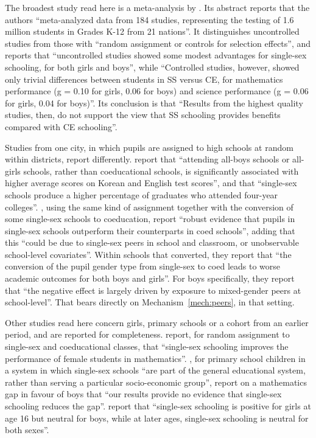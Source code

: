 \documentclass[11pt]{article}
\newcommand{\srcq}[2]{``#2''}
\newcounter{mech}
\begin{document}
The broadest study read here is a meta-analysis by \citet{pahlke2014}. Its abstract reports that the authors \srcq{pahlke2014}{meta-analyzed data from 184 studies, representing the testing of 1.6 million students in Grades K-12 from 21 nations}. It distinguishes uncontrolled studies from those with \srcq{pahlke2014}{random assignment or controls for selection effects}, and reports that \srcq{pahlke2014}{uncontrolled studies showed some modest advantages for single-sex schooling, for both girls and boys}, while \srcq{pahlke2014}{Controlled studies, however, showed only trivial differences between students in SS versus CE, for mathematics performance (g = 0.10 for girls, 0.06 for boys) and science performance (g = 0.06 for girls, 0.04 for boys)}. Its conclusion is that \srcq{pahlke2014}{Results from the highest quality studies, then, do not support the view that SS schooling provides benefits compared with CE schooling}.

Studies from one city, in which pupils are assigned to high schools at random within districts, report differently. \citet{park2012} report that \srcq{park2012}{attending all-boys schools or all-girls schools, rather than coeducational schools, is significantly associated with higher average scores on Korean and English test scores}, and that \srcq{park2012}{single-sex schools produce a higher percentage of graduates who attended four-year colleges}. \citet{dustmann2017}, using the same kind of assignment together with the conversion of some single-sex schools to coeducation, report \srcq{dustmann2017}{robust evidence that pupils in single-sex schools outperform their counterparts in coed schools}, adding that this \srcq{dustmann2017}{could be due to single-sex peers in school and classroom, or unobservable school-level covariates}. Within schools that converted, they report that \srcq{dustmann2017}{the conversion of the pupil gender type from single-sex to coed leads to worse academic outcomes for both boys and girls}. For boys specifically, they report that \srcq{dustmann2017}{the negative effect is largely driven by exposure to mixed-gender peers at school-level}. That bears directly on Mechanism~\ref{mech:peers}, in that setting.

Other studies read here concern girls, primary schools or a cohort from an earlier period, and are reported for completeness. \citet{eisenkopf2011} report, for random assignment to single-sex and coeducational classes, that \srcq{eisenkopf2011}{single-sex schooling improves the performance of female students in mathematics}. \citet{doris2012}, for primary school children in a system in which single-sex schools \srcq{doris2012}{are part of the general educational system, rather than serving a particular socio-economic group}, report on a mathematics gap in favour of boys that \srcq{doris2012}{our results provide no evidence that single-sex schooling reduces the gap}. \citet{sullivan2010} report that \srcq{sullivan2010}{single-sex schooling is positive for girls at age 16 but neutral for boys, while at later ages, single-sex schooling is neutral for both sexes}.
\end{document}
